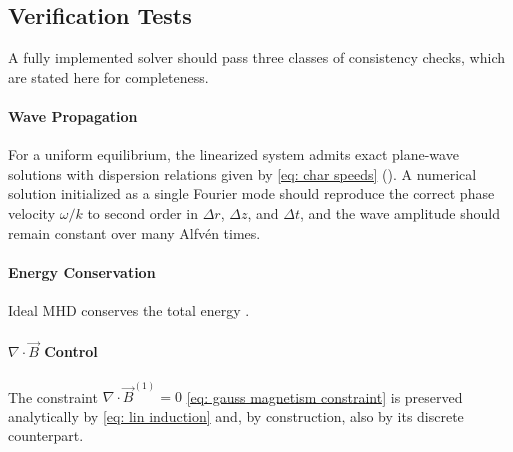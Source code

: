 \subsection{Verification Tests}
\label{subsec: verification tests}

A fully implemented solver should pass three classes of consistency checks,
which are stated here for completeness.


\paragraph{Wave Propagation}
For a uniform equilibrium, the linearized system admits exact plane-wave
solutions with dispersion relations given by \eqref{eq: char speeds}
(\cite{Freidberg2014}).
A numerical solution initialized as a single Fourier mode should reproduce
the correct phase velocity $\omega/k$ to second order in $\Delta r$, $\Delta z$,
and $\Delta t$, and the wave amplitude should remain constant over many Alfv\'{e}n times.

\paragraph{Energy Conservation}
Ideal MHD conserves the total energy \cite[Ch.~8]{Freidberg2014}.

\paragraph{$\nabla\cdot\vec{B}$ Control}
The constraint $\nabla\cdot\vec{B}^{(1)}=0$ \eqref{eq: gauss magnetism constraint}
is preserved analytically by \eqref{eq: lin induction} and, by
construction, also by its discrete counterpart.